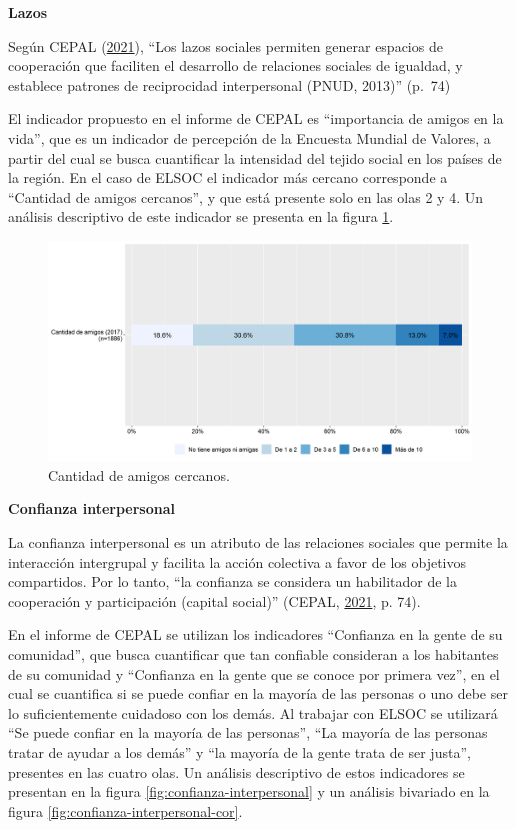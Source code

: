 \documentclass[
  12pt,
]{book}
\begin{document}
\textbf{Lazos}

Según CEPAL (\protect\hyperlink{ref-cepal_Cohesion_2021}{2021}), ``Los lazos sociales permiten generar espacios de cooperación que faciliten el desarrollo de relaciones sociales de igualdad, y establece patrones de reciprocidad interpersonal (PNUD, 2013)'' (p.~74)

El indicador propuesto en el informe de CEPAL es ``importancia de amigos en la vida'', que es un indicador de percepción de la Encuesta Mundial de Valores, a partir del cual se busca cuantificar la intensidad del tejido social en los países de la región. En el caso de ELSOC el indicador más cercano corresponde a ``Cantidad de amigos cercanos'', y que está presente solo en las olas 2 y 4. Un análisis descriptivo de este indicador se presenta en la figura \ref{fig:lazos}.

\begin{figure}[H]

{\centering \includegraphics[width=1\linewidth,height=1\textheight]{output/graphs/lazos} 

}

\caption{Cantidad de amigos cercanos.}\label{fig:lazos}
\end{figure}

\textbf{Confianza interpersonal}

La confianza interpersonal es un atributo de las relaciones sociales que permite la interacción intergrupal y facilita la acción colectiva a favor de los objetivos compartidos. Por lo tanto, ``la confianza se considera un habilitador de la cooperación y participación (capital social)'' (CEPAL, \protect\hyperlink{ref-cepal_Cohesion_2021}{2021}, p. 74).

En el informe de CEPAL se utilizan los indicadores ``Confianza en la gente de su comunidad'', que busca cuantificar que tan confiable consideran a los habitantes de su comunidad y ``Confianza en la gente que se conoce por primera vez'', en el cual se cuantifica si se puede confiar en la mayoría de las personas o uno debe ser lo suficientemente cuidadoso con los demás. Al trabajar con ELSOC se utilizará ``Se puede confiar en la mayoría de las personas'', ``La mayoría de las personas tratar de ayudar a los demás'' y ``la mayoría de la gente trata de ser justa'', presentes en las cuatro olas. Un análisis descriptivo de estos indicadores se presentan en la figura \ref{fig:confianza-interpersonal} y un análisis bivariado en la figura \ref{fig:confianza-interpersonal-cor}.
\end{document}
